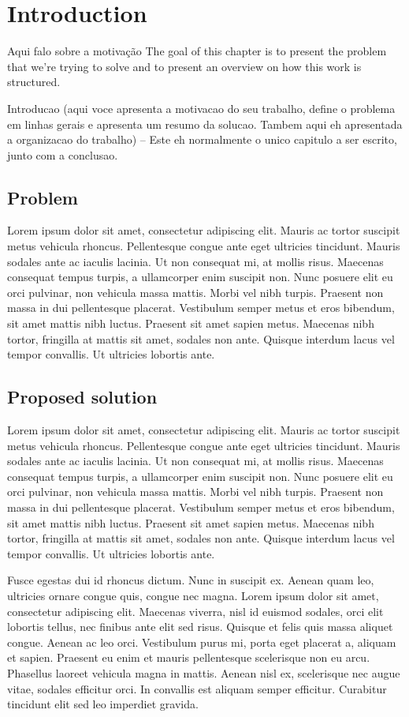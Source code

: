 \chapter{Introduction}
Aqui falo sobre a motivação
The goal of this chapter is to present the problem that we're trying to solve and to present an overview on how this work is structured.

Introducao (aqui voce apresenta a motivacao do seu trabalho, define
o problema em linhas gerais e apresenta um resumo da solucao. Tambem
aqui eh apresentada a organizacao do trabalho) -- Este eh normalmente o
unico capitulo a ser escrito, junto com a conclusao.

\section{Problem}
Lorem ipsum dolor sit amet, consectetur adipiscing elit. Mauris ac tortor suscipit metus vehicula rhoncus. Pellentesque congue ante eget ultricies tincidunt. Mauris sodales ante ac iaculis lacinia. Ut non consequat mi, at mollis risus. Maecenas consequat tempus turpis, a ullamcorper enim suscipit non. Nunc posuere elit eu orci pulvinar, non vehicula massa mattis. Morbi vel nibh turpis. Praesent non massa in dui pellentesque placerat. Vestibulum semper metus et eros bibendum, sit amet mattis nibh luctus. Praesent sit amet sapien metus. Maecenas nibh tortor, fringilla at mattis sit amet, sodales non ante. Quisque interdum lacus vel tempor convallis. Ut ultricies lobortis ante.

\section{Proposed solution}

Lorem ipsum dolor sit amet, consectetur adipiscing elit. Mauris ac tortor suscipit metus vehicula rhoncus. Pellentesque congue ante eget ultricies tincidunt. Mauris sodales ante ac iaculis lacinia. Ut non consequat mi, at mollis risus. Maecenas consequat tempus turpis, a ullamcorper enim suscipit non. Nunc posuere elit eu orci pulvinar, non vehicula massa mattis. Morbi vel nibh turpis. Praesent non massa in dui pellentesque placerat. Vestibulum semper metus et eros bibendum, sit amet mattis nibh luctus. Praesent sit amet sapien metus. Maecenas nibh tortor, fringilla at mattis sit amet, sodales non ante. Quisque interdum lacus vel tempor convallis. Ut ultricies lobortis ante.

Fusce egestas dui id rhoncus dictum. Nunc in suscipit ex. Aenean quam leo, ultricies ornare congue quis, congue nec magna. Lorem ipsum dolor sit amet, consectetur adipiscing elit. Maecenas viverra, nisl id euismod sodales, orci elit lobortis tellus, nec finibus ante elit sed risus. Quisque et felis quis massa aliquet congue. Aenean ac leo orci. Vestibulum purus mi, porta eget placerat a, aliquam et sapien. Praesent eu enim et mauris pellentesque scelerisque non eu arcu. Phasellus laoreet vehicula magna in mattis. Aenean nisl ex, scelerisque nec augue vitae, sodales efficitur orci. In convallis est aliquam semper efficitur. Curabitur tincidunt elit sed leo imperdiet gravida.

